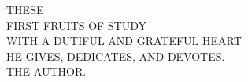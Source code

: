 \vspace*{0.25\textheight}
\begin{center}
THESE\\[0.6em]
FIRST FRUITS OF STUDY\\[0.6em]
WITH A DUTIFUL AND GRATEFUL HEART\\[1.2em]
HE GIVES, DEDICATES, AND DEVOTES.\\[1.0em]
THE AUTHOR.
\end{center}
